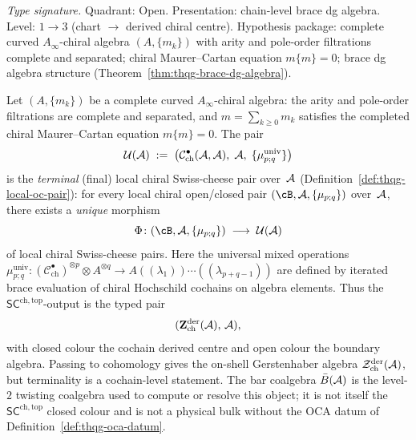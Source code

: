 \begin{theorem}
\label{thm:thqg-swiss-cheese}
\textit{Type signature.}
Quadrant: Open. Presentation: chain-level brace dg algebra.
Level: $1 \to 3$ (chart $\to$ derived chiral centre).
Hypothesis package: complete curved $A_\infty$-chiral algebra
$(A, \{m_k\})$ with arity and pole-order filtrations complete and
separated; chiral Maurer--Cartan equation $m\{m\} = 0$;
brace dg algebra structure
\textup{(}Theorem~\ref{thm:thqg-brace-dg-algebra}\textup{)}.

\medskip
Let $(A, \{m_k\})$ be a complete curved $A_\infty$-chiral algebra:
the arity and pole-order filtrations are complete and separated, and
$m=\sum_{k\geq 0}m_k$ satisfies the completed chiral
Maurer--Cartan equation $m\{m\}=0$.
The pair
\begin{equation}\label{eq:thqg-universal-oc-pair}
\mathcal{U}(\mathcal{A})
\;:=\;
\bigl(\mathcal{C}^{\bullet}_{\mathrm{ch}}(\mathcal{A}, \mathcal{A}),\;
\mathcal{A},\; \{\mu^{\mathrm{univ}}_{p;q}\}\bigr)
\end{equation}
is the \emph{terminal} \textup{(}final\textup{)} local chiral
Swiss-cheese pair over~$\mathcal{A}$
\textup{(}Definition~\textup{\ref{def:thqg-local-oc-pair}}\textup{)}:
for every local chiral open/closed pair
$(\cB, \cA, \{\mu_{p;q}\})$ over~$\mathcal{A}$, there exists a
\emph{unique} morphism
\[
\Phi \colon (\cB, \cA, \{\mu_{p;q}\})
\;\longrightarrow\; \mathcal{U}(\cA)
\]
of local chiral Swiss-cheese pairs.
Here the universal mixed operations
$\mu^{\mathrm{univ}}_{p;q} \colon
(\mathcal{C}^{\bullet}_{\mathrm{ch}})^{\otimes p}
\otimes A^{\otimes q}
\to A((\lambda_1))\cdots((\lambda_{p+q-1}))$
are defined by iterated brace evaluation of chiral Hochschild
cochains on algebra elements. Thus the
\(\mathsf{SC}^{\mathrm{ch,top}}\)-output is the typed pair
\[
(\mathbf{Z}^{\mathrm{der}}_{\mathrm{ch}}(\mathcal{A}),\,\mathcal{A}),
\]
with closed colour the cochain derived centre and open colour the
boundary algebra. Passing to cohomology gives the on-shell
Gerstenhaber algebra \(\mathcal{Z}^{\mathrm{der}}_{\mathrm{ch}}(\mathcal{A})\),
but terminality is a cochain-level statement. The bar coalgebra
\(\bar B(\mathcal{A})\) is the level-\(2\) twisting coalgebra used to compute
or resolve this object; it is not itself the
\(\mathsf{SC}^{\mathrm{ch,top}}\) closed colour and is not a physical
bulk without the OCA datum of Definition~\ref{def:thqg-oca-datum}.
\end{theorem}

